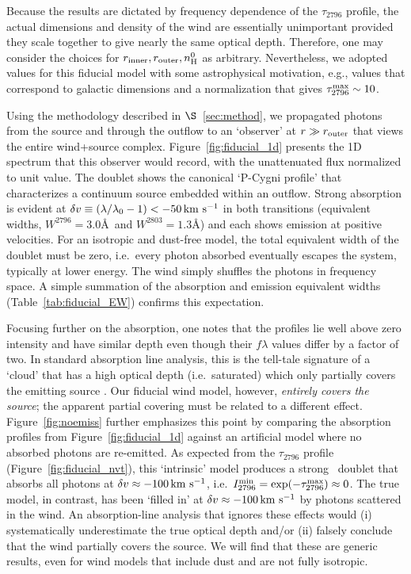 \documentclass[12pt,preprint]{aastex}
\begin{document}
Because the results are dictated by frequency dependence of the
$\tau_{2796}$ profile, 
the actual dimensions and density of the wind are
essentially unimportant provided they scale together to give nearly the same
optical depth. Therefore, one may consider the choices for
$r_{\rm inner}, r_{\rm outer}, n_{\rm H}^0$ as arbitrary.
Nevertheless, we adopted values for this fiducial model with
some astrophysical motivation,  e.g., values that correspond to
galactic dimensions and a normalization that gives $\tau_{2796}^{\rm
  max} \sim 10$.


Using the methodology described in $\S$~\ref{sec:method}, we
propagated photons from the source and through the outflow to an
`observer' at $r \gg r_{\rm outer}$ that views the entire wind+source
complex.  Figure~\ref{fig:fiducial_1d} presents the 1D spectrum
that this observer would record, with the unattenuated flux
normalized to unit value.   The  doublet
shows the canonical `P-Cygni profile' that characterizes a continuum
source embedded within an outflow.  Strong absorption is evident at
$\delta v  \equiv (\lambda/\lambda_0 - 1) < -50 \, {\rm km~s^{-1}}$ in both transitions (equivalent widths, $W^{2796} =
3.0$\AA\ and $W^{2803} = 1.3$\AA) and each shows emission at
positive velocities.  For an isotropic and dust-free model, the
total equivalent width of the doublet must be zero,
i.e.\ every photon
absorbed eventually escapes the system, typically at lower
energy.  The wind simply shuffles the photons in frequency space.
A simple summation of the absorption and emission equivalent widths
(Table~\ref{tab:fiducial_EW}) confirms this expectation.

Focusing further on the  absorption, one notes that the profiles lie
well above zero intensity and have similar depth even though their $f\lambda$
values differ by a factor of two.  In standard absorption line
analysis, this is 
the tell-tale signature of a `cloud' that has a high optical depth (i.e.\
saturated) which only partially covers the emitting source
\citep[e.g.][]{rvs05a,hkp+10}.  Our fiducial wind model, however, 
{\it entirely covers the source}; the apparent partial covering must
be related to a different effect.
Figure~\ref{fig:noemiss} further emphasizes this point by comparing the 
absorption profiles from Figure~\ref{fig:fiducial_1d} against an
artificial model where no absorbed photons are 
re-emitted.   As expected from the
$\tau_{2796}$ profile (Figure~\ref{fig:fiducial_nvt}), this
`intrinsic' model
produces a strong \mgiid\ doublet that absorbs all photons at
$\delta v \approx -100 \, {\rm km~s^{-1}}$, i.e.\ $I_{2796}^{\rm min} = \exp(-\tau^{\rm
  max}_{2796}) \approx 0$.
The true model, in contrast, has been `filled in' at $\delta v \approx -100
\, {\rm km~s^{-1}}$ by photons scattered in the wind.  An
absorption-line analysis that ignores these effects
would (i) systematically underestimate the true optical
depth and/or (ii) falsely conclude that the wind partially covers the
source.  We will find that these are
generic results, even for wind models that include
dust and are not fully isotropic.
\end{document}
